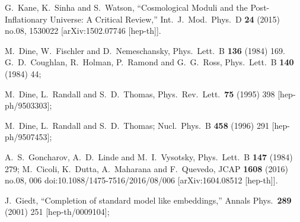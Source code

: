 \documentclass[12pt]{article}
\numberwithin{equation}{section}
\begin{document}
\begin{thebibliography}{99}
  G.~Kane, K.~Sinha and S.~Watson,
  ``Cosmological Moduli and the Post-Inflationary Universe: A Critical Review,''
  Int.\ J.\ Mod.\ Phys.\ D {\bf 24} (2015) no.08,  1530022
  [arXiv:1502.07746 [hep-th]].

 
  M.~Dine, W.~Fischler and D.~Nemeschansky,
  Phys.\ Lett.\ B {\bf 136} (1984) 169.
%
  G.~D.~Coughlan, R.~Holman, P.~Ramond and G.~G.~Ross,
  Phys.\ Lett.\ B {\bf 140} (1984) 44;
%

  M.~Dine, L.~Randall and S.~D.~Thomas,
  Phys.\ Rev.\ Lett.\  {\bf 75} (1995) 398
  [hep-ph/9503303];
%

  M.~Dine, L.~Randall and S.~D.~Thomas;
  Nucl.\ Phys.\ B {\bf 458} (1996) 291
  [hep-ph/9507453];
%  
%

  A.~S.~Goncharov, A.~D.~Linde and M.~I.~Vysotsky,
  Phys.\ Lett.\ B {\bf 147} (1984) 279;
%
  M.~Cicoli, K.~Dutta, A.~Maharana and F.~Quevedo,
  JCAP {\bf 1608} (2016) no.08,  006
  doi:10.1088/1475-7516/2016/08/006
  [arXiv:1604.08512 [hep-th]].
  
 
  J.~Giedt,
  ``Completion of standard model like embeddings,''
  Annals Phys.\  {\bf 289} (2001) 251
  [hep-th/0009104];



\end{thebibliography}
\end{document}
